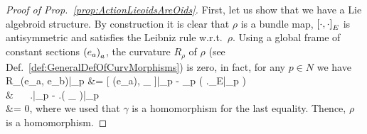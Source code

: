 \begin{proof}[Proof of Prop.~\ref{prop:ActionLieoidsAreOids}]
\leavevmode\newline
First, let us show that we have a Lie algebroid structure.
By construction it is clear that $\rho$ is a bundle map, $\mleft[ \cdot, \cdot \mright]_E$ is antisymmetric and satisfies the Leibniz rule w.r.t.~$\rho$. Using a global frame of constant sections $\mleft( e_a \mright)_a$, the curvature $R_\rho$ of $\rho$ (see Def.~\ref{def:GeneralDefOfCurvMorphisms}) is zero, in fact, for any $p \in N$ we have 
\bas
R_\rho(e_a, e_b)|_p
&=
[ \rho(e_a), _{} ]|_p 
	- \rho_p \mleft( \mleft.\mleft[ e_a, e_b \mright]_E\mright|_p \mright)
\\
& ~~
\mleft.\mright|_p 
	- \mleft.\gamma\mleft( \mleft[ e_a, e_b \mright]_{} \mright)\mright|_p
\\
&= 
0,
\eas
where we used that $\gamma$ is a homomorphism for the last equality. Thence, $\rho$ is a homomorphism.
	

\end{proof}
